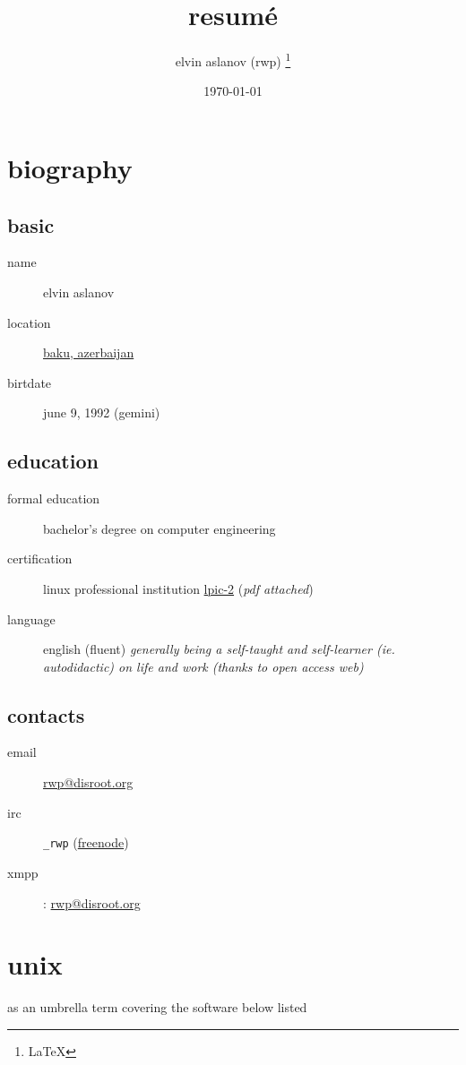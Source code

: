 \documentclass{article}
\title{resumé}
\author{elvin aslanov (rwp) \thanks{\LaTeX}}
\date{\today}
\begin{document}
\begin{titlepage}
\maketitle
\end{titlepage}
\section{biography}
\subsection{basic}
\begin{description}
\item[name] elvin aslanov
\item[location] \href{https://www.openstreetmap.org/relation/2415335}{baku, azerbaijan}
\item[birtdate] june 9, 1992 (gemini)
\end{description}
\subsection{education}
\begin{description}
\item[formal education] bachelor's degree on computer engineering
\item[certification] linux professional institution \href{https://cs.lpi.org/caf/Xamman/certification/verify/LPI000307519/bafrejwgeb}{lpic-2} (\textit{pdf attached})
\item[language] english (fluent)
\textit{generally being a self-taught and self-learner (ie. autodidactic) on life and work (thanks to open access web)}
\end{description}
\subsection{contacts}
\begin{description}
\item[email] \href{mailto:rwp@disroot.org}{rwp@disroot.org}
\item[irc] \verb|_rwp| (\href{https://freenode.net/}{freenode})
\item[xmpp]: \url{rwp@disroot.org}
\end{description}
\section{unix} %
as an umbrella term covering the software below listed
\end{document}
